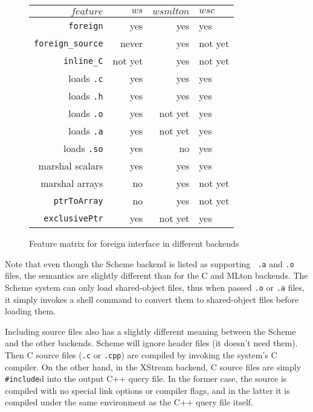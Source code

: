 \begin{figure}
\begin{center}
\begin{tabular}{|r|r|r|l|}
\hline $feature$ & $ws$ & $wsmlton$ & $wsc$ \\
\hline

{\tt foreign}         & yes     & yes & yes \\
{\tt foreign\_source} & never   & yes & not yet \\
{\tt inline\_C}       & not yet & yes & not yet \\

loads {\tt .c}        & yes     & yes     & yes \\
loads {\tt .h}        & yes     & yes     & yes \\
loads {\tt .o}        & yes     & not yet & yes \\
loads {\tt .a}        & yes     & not yet & yes \\
loads {\tt .so}       & yes     & no      & yes \\


marshal scalars    & yes     & yes      & yes \\
marshal arrays     & no      & yes      & not yet \\
{\tt ptrToArray}   & no      & yes      & not yet \\
{\tt exclusivePtr} & yes     & not yet  & yes \\

\hline
\end{tabular}
\end{center}
\caption{Feature matrix for foreign interface in different backends}
\label{f:features}
\end{figure}

Note that even though the Scheme backend is listed as supporting {\tt
.a} and {\tt .o} files, the semantics are slightly different than for
the C and MLton backends.  The Scheme system can only load
shared-object files, thus when passed {\tt .o} or {\tt .a} files, it
simply invokes a shell command to convert them to shared-object files
before loading them.

Including source files also has a slightly different meaning between
the Scheme and the other backends.  Scheme will ignore header files
(it doesn't need them).  Then C source files ({\tt .c} or {\tt .cpp})
are compiled by invoking the system's C compiler.  On the other hand,
in the XStream backend, C source files are simply {\tt \#include}d
into the output C++ query file.  In the former case, the source is
compiled with no special link options or compiler flags, and in the
latter it is compiled under the same environment as the C++ query file
itself.  

